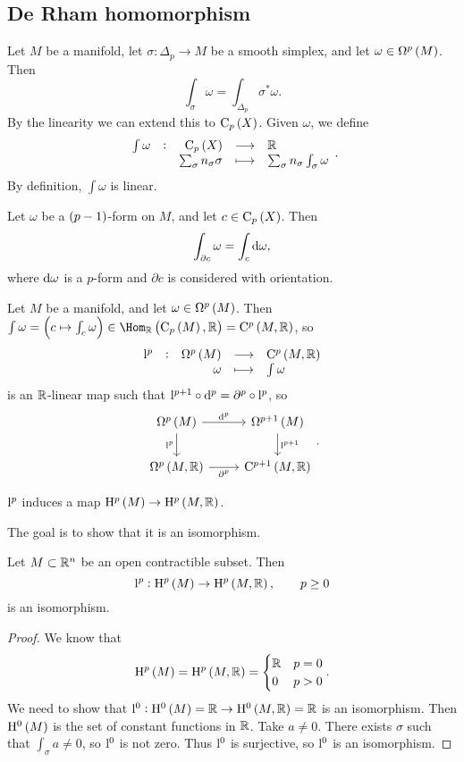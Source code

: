 \subsection{De Rham homomorphism}

Let $ M $ be a manifold, let $ \sigma : \Delta_p \to M $ be a smooth simplex, and let $ \omega \in \Omega^p\br{M} $. Then
$$ \int_\sigma \omega = \int_{\Delta_p} \sigma^*\omega. $$
By the linearity we can extend this to $ \C_p\br{X} $. Given $ \omega $, we define
$$ \function[\int \omega]{\C_p\br{X}}{\RR}{\sum_\sigma n_\sigma\sigma}{\sum_\sigma n_\sigma\int_\sigma \omega}. $$
By definition, $ \int \omega $ is linear.

\begin{theorem}
Let $ \omega $ be a $ \br{p - 1} $-form on $ M $, and let $ c \in \C_p\br{X} $. Then
$$ \int_{\partial c} \omega = \int_c \mathrm{d}\omega, $$
where $ \mathrm{d}\omega $ is a $ p $-form and $ \partial c $ is considered with orientation.
\end{theorem}

Let $ M $ be a manifold, and let $ \omega \in \Omega^p\br{M} $. Then $ \int \omega = \br{c \mapsto \int_c \omega} \in \Hom_\RR\br{\C_p\br{M}, \RR} = \C^p\br{M, \RR} $, so
$$ \function[\l^p]{\Omega^p\br{M}}{\C^p\br{M, \RR}}{\omega}{\int \omega} $$
is an $ \mathbb{R} $-linear map such that $ \mathrm{l}^{p + 1} \circ \mathrm{d}^p = \partial^p \circ \mathrm{l}^p $, so
$$
\begin{tikzcd}
\Omega^p\br{M} \arrow{r}{\d^p} \arrow[swap]{d}{\l^p} & \Omega^{p + 1}\br{M} \arrow{d}{\l^{p + 1}} \\
\Omega^p\br{M, \RR} \arrow[swap]{r}{\partial^p} & \C^{p + 1}\br{M, \RR}
\end{tikzcd}.
$$

\begin{exercise*}
$ \mathrm{l}^p $ induces a map $ \H^p\br{M} \to \H^p\br{M, \RR} $.
\end{exercise*}

\pagebreak

The goal is to show that it is an isomorphism.

\begin{lemma}
\label{lem:4.10}
Let $ M \subset \mathbb{R}^n $ be an open contractible subset. Then
$$ \l^p : \H^p\br{M} \to \H^p\br{M, \RR}, \qquad p \ge 0 $$
is an isomorphism.
\end{lemma}

\begin{proof}
We know that
$$ \H^p\br{M} = \H^p\br{M, \RR} =
\begin{cases}
\RR & p = 0 \\
0 & p > 0
\end{cases}.
$$
We need to show that $ \l^0 : \H^0\br{M} = \RR \to \H^0\br{M, \RR} = \RR $ is an isomorphism. Then $ \H^0\br{M} $ is the set of constant functions in $ \mathbb{R} $. Take $ a \ne 0 $. There exists $ \sigma $ such that $ \int_\sigma a \ne 0 $, so $ \mathrm{l}^0 $ is not zero. Thus $ \mathrm{l}^0 $ is surjective, so $ \mathrm{l}^0 $ is an isomorphism.
\end{proof}

